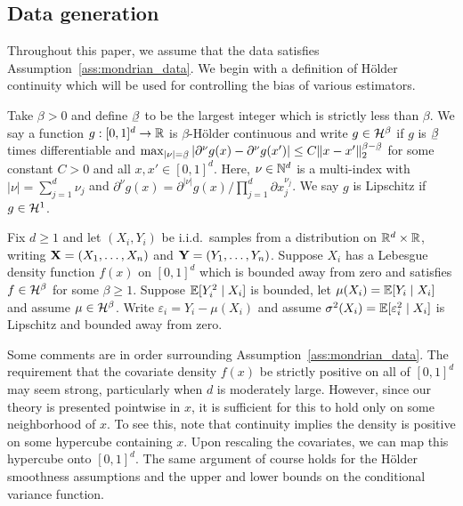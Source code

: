 \subsection{Data generation}

Throughout this paper,
we assume that the data satisfies Assumption~\ref{ass:mondrian_data}.
We begin with a definition of H{\"o}lder continuity
which will be used for controlling the bias of various estimators.

\begin{definition}%

  Take $\beta > 0$ and define
  $\flbeta$ to be the largest integer which is strictly less than $\beta$.
  We say a function $g: [0,1]^d \to \mathbb{R}$
  is $\beta$-H{\"o}lder continuous and
  write $g \in \mathcal{H}^\beta$ if
  $g$ is $\flbeta$ times differentiable and
  $\max_{|\nu| = \flbeta}
  \left| \partial^\nu g(x) - \partial^{\nu} g(x') \right|
  \leq C \|x-x'\|_2^{\beta - \flbeta}$
  for some constant $C > 0$
  and all $x, x' \in [0,1]^d$.
  Here, $\nu \in \mathbb{N}^d$ is a multi-index with
  $|\nu| = \sum_{j=1}^d \nu_j$ and
  $\partial^{\nu} g(x) =
  \partial^{|\nu|} g(x) \big/ \prod_{j=1}^d \partial x_j^{\nu_j}$.
  We say $g$ is Lipschitz if $g \in \mathcal{H}^1$.

\end{definition}

\begin{assumption}%
  \label{ass:mondrian_data}

  Fix $d \geq 1$ and
  let $(X_i, Y_i)$ be i.i.d.\ samples from a distribution
  on $\mathbb{R}^d \times \mathbb{R}$,
  writing $\mathbf{X} = (X_1, \ldots, X_n)$
  and $\mathbf{Y} = (Y_1, \ldots, Y_n)$.
  Suppose $X_i$ has a Lebesgue density function $f(x)$
  on $[0,1]^d$ which is bounded away from zero
  and satisfies $f \in \mathcal{H}^\beta$ for some $\beta \geq 1$.
  Suppose $\mathbb{E}[Y_i^2 \mid X_i]$ is bounded,
  let $\mu(X_i) = \mathbb{E}[Y_i \mid X_i]$
  and assume $\mu \in \mathcal{H}^\beta$.
  Write $\varepsilon_i = Y_i - \mu(X_i)$ and assume
  $\sigma^2(X_i) = \mathbb{E}[\varepsilon_i^2 \mid X_i]$ is Lipschitz
  and bounded away from zero.

\end{assumption}

Some comments are in order surrounding Assumption~\ref{ass:mondrian_data}.
The requirement that the covariate density $f(x)$
be strictly positive on all of $[0,1]^d$ may seem strong,
particularly when $d$ is moderately large.
However, since our theory is presented pointwise in $x$,
it is sufficient for this to hold only on some neighborhood of $x$.
To see this, note that continuity implies the density
is positive on some hypercube containing $x$. Upon rescaling
the covariates, we can map this hypercube onto $[0,1]^d$.
The same argument of course holds for the H{\"o}lder smoothness
assumptions and the upper and lower bounds on the conditional variance
function.

